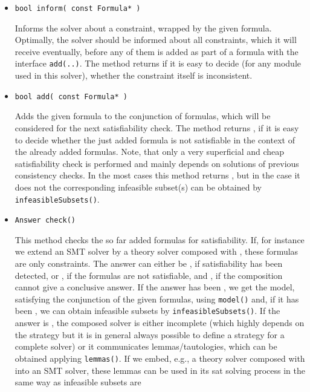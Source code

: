 \begin{itemize}
	\item \begin{verbatim}bool inform( const Formula* )\end{verbatim}
		Informs the solver about a constraint, wrapped by the given formula. 
		Optimally, the solver should be informed about all constraints,
        which it will receive eventually, before any of them is added as part of a formula with the 
        interface \texttt{add(..)}. The method returns \false if it is easy to decide (for any module used in this solver), whether 
        the constraint itself is inconsistent.
	\item \begin{verbatim}bool add( const Formula* )\end{verbatim}
		Adds the given formula to the conjunction of formulas, which will be considered for the next 
        satisfiability check. The method returns \false, if it is easy to decide whether the just added formula is not satisfiable
        in the context of the already added formulas. Note, that only a very superficial and cheap satisfiability check
        is performed and mainly depends on solutions of previous consistency checks. In the most cases this method returns \true,
        but in the case it does not the corresponding infeasible subset(s) can be obtained by
        \texttt{infeasibleSubsets()}.
    \item \begin{verbatim}Answer check()\end{verbatim}
    	This method checks the so far added formulas for satisfiability. If, for instance we extend an SMT solver
	by a theory solver composed with \smtrat, these formulas are only constraints. The answer can either be
    	\True, if satisfiability has been detected, or 
    	\False, if the formulas are not satisfiable, and \Unknown, if the composition
    	cannot give a conclusive answer. If the answer has been \True, we get the model, satisfying the conjunction
	of the given formulas, using \texttt{model()} and, if it has been \False, we can obtain infeasible subsets by
	\texttt{infeasibleSubsets()}.
	If the answer is \Unknown, the composed solver is either incomplete (which highly depends on the strategy
	but it is in general always possible to define a strategy for a complete \smtrat solver) or it
	communicates lemmas/tautologies, which can be obtained applying \texttt{lemmas()}. 
	If we embed, e.g., a theory solver composed with \smtrat into an
	SMT solver, these lemmas can be used in its sat solving process in the same way as infeasible subsets are 

\end{itemize}
